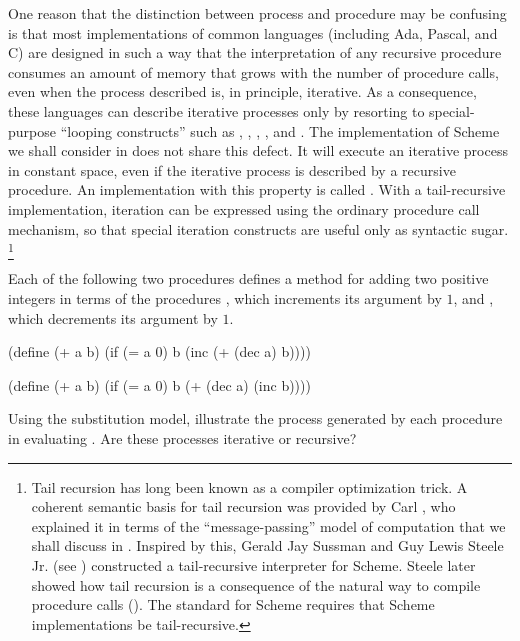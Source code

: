 One reason that the distinction between process and procedure may be confusing is that most implementations of common languages (including Ada, Pascal, and C) are designed in such a way that the interpretation of any recursive procedure consumes an amount of memory that grows with the number of procedure calls, even when the process described is, in principle, iterative.
As a consequence, these languages can describe iterative processes only by resorting to special-purpose “looping constructs” such as , , , , and .
The implementation of Scheme we shall consider in  does not share this defect.
It will execute an iterative process in constant space, even if the iterative process is described by a recursive procedure.
An implementation with this property is called .
With a tail-recursive implementation, iteration can be expressed using the ordinary procedure call mechanism, so that special iteration constructs are useful only as syntactic sugar.%
\footnote{
	Tail recursion has long been known as a compiler optimization trick.
	A coherent semantic basis for tail recursion was provided by Carl , who explained it in terms of the “message-passing” model of computation that we shall discuss in .
	Inspired by this, Gerald Jay Sussman and Guy Lewis Steele Jr. (see ) constructed a tail-recursive interpreter for Scheme.
	Steele later showed how tail recursion is a consequence of the natural way to compile procedure calls ().
  The  standard for Scheme requires that Scheme implementations be tail-recursive.
}



\begin{exercise}
	\label{Exercise 1.9}
	Each of the following two procedures defines a method for adding two positive integers in terms of the procedures , which increments its argument by \( 1 \), and , which decrements its argument by \( 1 \).
	\begin{scheme}
	  (define (+ a b)
	    (if (= a 0) b (inc (+ (dec a) b))))

	  (define (+ a b)
	    (if (= a 0) b (+ (dec a) (inc b))))
	\end{scheme}
	Using the substitution model, illustrate the process generated by each procedure in evaluating .
	Are these processes iterative or recursive?
\end{exercise}



